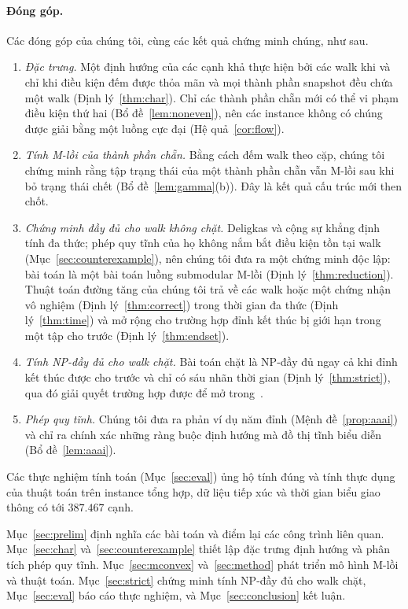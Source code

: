 \documentclass[pdflatex,sn-mathphys-num]{sn-jnl}
\theoremstyle{thmstyleone}%
\theoremstyle{thmstyletwo}%
\theoremstyle{thmstylethree}%
\begin{document}
\paragraph{Đóng góp.} Các đóng góp của chúng tôi, cùng các kết quả chứng minh chúng, như sau.
\begin{enumerate}
\item \emph{Đặc trưng.} Một định hướng của các cạnh khả thực hiện bởi các walk khi và chỉ khi điều kiện đếm được thỏa mãn và mọi thành phần snapshot đều chứa một walk (Định lý~\ref{thm:char}). Chỉ các thành phần chẵn mới có thể vi phạm điều kiện thứ hai (Bổ đề~\ref{lem:noneven}), nên các instance không có chúng được giải bằng một luồng cực đại (Hệ quả~\ref{cor:flow}).
\item \emph{Tính M-lồi của thành phần chẵn.} Bằng cách đếm walk theo cặp, chúng tôi chứng minh rằng tập trạng thái của một thành phần chẵn vẫn M-lồi sau khi bỏ trạng thái chết (Bổ đề~\ref{lem:gamma}(b)). Đây là kết quả cấu trúc mới then chốt.
\item \emph{Chứng minh đầy đủ cho walk không chặt.} Deligkas và cộng sự khẳng định tính đa thức; phép quy tĩnh của họ không nắm bắt điều kiện tồn tại walk (Mục~\ref{sec:counterexample}), nên chúng tôi đưa ra một chứng minh độc lập: bài toán là một bài toán luồng submodular M-lồi (Định lý~\ref{thm:reduction}). Thuật toán đường tăng của chúng tôi trả về các walk hoặc một chứng nhận vô nghiệm (Định lý~\ref{thm:correct}) trong thời gian đa thức (Định lý~\ref{thm:time}) và mở rộng cho trường hợp đỉnh kết thúc bị giới hạn trong một tập cho trước (Định lý~\ref{thm:endset}).
\item \emph{Tính NP-đầy đủ cho walk chặt.} Bài toán chặt là NP-đầy đủ ngay cả khi đỉnh kết thúc được cho trước và chỉ có sáu nhãn thời gian (Định lý~\ref{thm:strict}), qua đó giải quyết trường hợp được để mở trong~\cite{deligkas2025}.
\item \emph{Phép quy tĩnh.} Chúng tôi đưa ra phản ví dụ năm đỉnh (Mệnh đề~\ref{prop:aaai}) và chỉ ra chính xác những ràng buộc định hướng mà đồ thị tĩnh biểu diễn (Bổ đề~\ref{lem:aaai}).
\end{enumerate}
Các thực nghiệm tính toán (Mục~\ref{sec:eval}) ủng hộ tính đúng và tính thực dụng của thuật toán trên instance tổng hợp, dữ liệu tiếp xúc và thời gian biểu giao thông có tới $387.467$ cạnh.

Mục~\ref{sec:prelim} định nghĩa các bài toán và điểm lại các công trình liên quan. Mục~\ref{sec:char} và~\ref{sec:counterexample} thiết lập đặc trưng định hướng và phân tích phép quy tĩnh. Mục~\ref{sec:mconvex} và~\ref{sec:method} phát triển mô hình M-lồi và thuật toán. Mục~\ref{sec:strict} chứng minh tính NP-đầy đủ cho walk chặt, Mục~\ref{sec:eval} báo cáo thực nghiệm, và Mục~\ref{sec:conclusion} kết luận.
\end{document}
